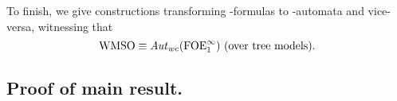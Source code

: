 



To finish, we give constructions transforming \wmso-formulas to
\wmso-automata and vice-versa, witnessing that
%
\begin{equation}
\label{eq:m3}
\wmso \equiv \AutWC(\ofoei) \text{ (over tree models)}.
\end{equation}

\subsection{Proof of main result.}

